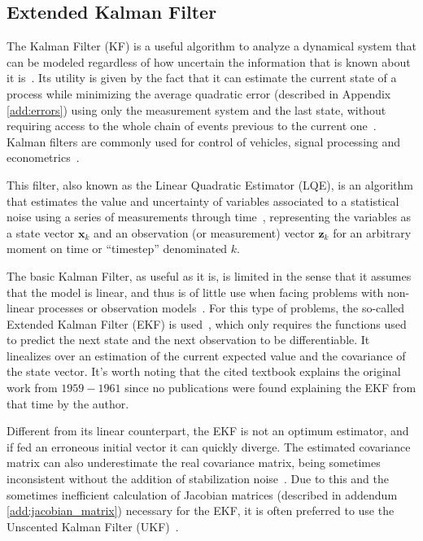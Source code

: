 \subsection{Extended Kalman Filter} \label{ssec:framework_ekf}
The Kalman Filter (KF) is a useful algorithm to analyze a dynamical system that can be modeled regardless of how uncertain the information that is known about it is~\cite{rauch1965maximum}.
Its utility is given by the fact that it can estimate the current state of a process while minimizing the average quadratic error (described in Appendix \ref{add:errors}) using only the measurement system and the last state, without requiring access to the whole chain of events previous to the current one~\cite{einicke2006optimal}.
Kalman filters are commonly used for control of vehicles, signal processing and econometrics~\cite{zarchan2013fundamentals}.

This filter, also known as the Linear Quadratic Estimator (LQE), is an algorithm that estimates the value and uncertainty of variables associated to a statistical noise using a series of measurements through time~\cite{kalman1960new}, representing the variables as a state vector $\mathbf{x}_k$ and an observation (or measurement) vector $\mathbf{z}_k$ for an arbitrary moment on time or ``timestep'' denominated $k$.

The basic Kalman Filter, as useful as it is, is limited in the sense that it assumes that the model is linear, and thus is of little use when facing problems with non-linear processes or observation models~\cite{simon2006optimal}.
For this type of problems, the so-called Extended Kalman Filter (EKF) is used~\cite{karimipour2015extended}, which only requires the functions used to predict the next state and the next observation to be differentiable.
It linealizes over an estimation of the current expected value and the covariance of the state vector.
It's worth noting that the cited textbook explains the original work from $1959-1961$ since no publications were found explaining the EKF from that time by the author.

Different from its linear counterpart, the EKF is not an optimum estimator, and if fed an erroneous initial vector it can quickly diverge.
The estimated covariance matrix can also underestimate the real covariance matrix, being sometimes inconsistent without the addition of stabilization noise~\cite{julier1997new}.
Due to this and the sometimes inefficient calculation of Jacobian matrices (described in addendum \ref{add:jacobian_matrix}) necessary for the EKF, it is often preferred to use the Unscented Kalman Filter (UKF)~\cite{julier1997new}.

